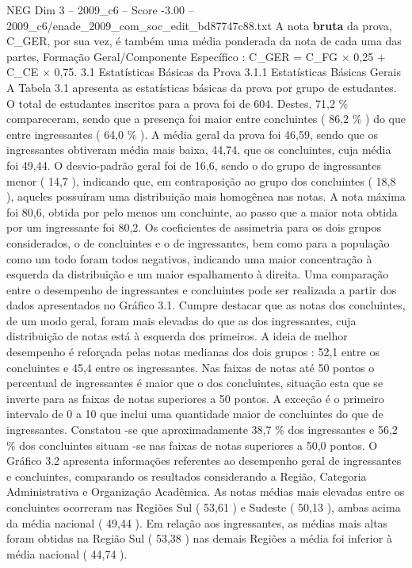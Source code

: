 \begin{textsample}{NEG Dim 3 – 2009\_c6 – Score -3.00 – 2009\_c6/enade\_2009\_com\_soc\_edit\_bd87747c88.txt}
A nota \textbf{bruta} da prova, C\_GER, por sua vez, é também uma média ponderada da nota de cada uma das partes, Formação Geral/Componente Específico : C\_GER = C\_FG × 0,25 + C\_CE × 0,75. 3.1 Estatísticas Básicas da Prova 3.1.1 Estatísticas Básicas Gerais A Tabela 3.1 apresenta as estatísticas básicas da prova por grupo de estudantes.
O total de estudantes inscritos para a prova foi de 604.
Destes, 71,2 \% compareceram, sendo que a presença foi maior entre concluintes ( 86,2 \% ) do que entre ingressantes ( 64,0 \% ).
A média geral da prova foi 46,59, sendo que os ingressantes obtiveram média mais baixa, 44,74, que os concluintes, cuja média foi 49,44.
O desvio-padrão geral foi de 16,6, sendo o do grupo de ingressantes menor ( 14,7 ), indicando que, em contraposição ao grupo dos concluintes ( 18,8 ), aqueles possuíram uma distribuição mais homogênea nas notas.
A nota máxima foi 80,6, obtida por pelo menos um concluinte, ao passo que a maior nota obtida por um ingressante foi 80,2.
Os coeficientes de assimetria para os dois grupos considerados, o de concluintes e o de ingressantes, bem como para a população como um todo foram todos negativos, indicando uma maior concentração à esquerda da distribuição e um maior espalhamento à direita.
Uma comparação entre o desempenho de ingressantes e concluintes pode ser realizada a partir dos dados apresentados no Gráfico 3.1.
Cumpre destacar que as notas dos concluintes, de um modo geral, foram mais elevadas do que as dos ingressantes, cuja distribuição de notas está à esquerda dos primeiros.
A ideia de melhor desempenho é reforçada pelas notas medianas dos dois grupos : 52,1 entre os concluintes e 45,4 entre os ingressantes.
Nas faixas de notas até 50 pontos o percentual de ingressantes é maior que o dos concluintes, situação esta que se inverte para as faixas de notas superiores a 50 pontos.
A exceção é o primeiro intervalo de 0 a 10 que inclui uma quantidade maior de concluintes do que de ingressantes.
Constatou -se que aproximadamente 38,7 \% dos ingressantes e 56,2 \% dos concluintes situam -se nas faixas de notas superiores a 50,0 pontos.
O Gráfico 3.2 apresenta informações referentes ao desempenho geral de ingressantes e concluintes, comparando os resultados considerando a Região, Categoria Administrativa e Organização Acadêmica.
As notas médias mais elevadas entre os concluintes ocorreram nas Regiões Sul ( 53,61 ) e Sudeste ( 50,13 ), ambas acima da média nacional ( 49,44 ).
Em relação aos ingressantes, as médias mais altas foram obtidas na Região Sul ( 53,38 ) nas demais Regiões a média foi inferior à média nacional ( 44,74 ).

\end{textsample}
